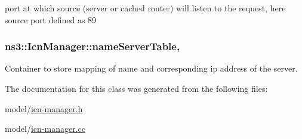 port at which source (server or cached router) will listen to the request, here source port defined as 89 

\hypertarget{classns3_1_1IcnManager_afdafc5390fdc600ab83393fd1778ddd9}{
\subsubsection[{name\-Server\-Table}]{ ns3\-::\-Icn\-Manager\-::name\-Server\-Table\hspace{0.3cm}{\ttfamily [static]}, {\ttfamily [private]}}}\label{classns3_1_1IcnManager_afdafc5390fdc600ab83393fd1778ddd9}


Container to store mapping of name and corresponding ip address of the server. 



The documentation for this class was generated from the following files\-:\begin{DoxyCompactItemize}
\item 
model/\hyperlink{icn-manager_8h}{icn-\/manager.\-h}\item 
model/\hyperlink{icn-manager_8cc}{icn-\/manager.\-cc}\end{DoxyCompactItemize}
